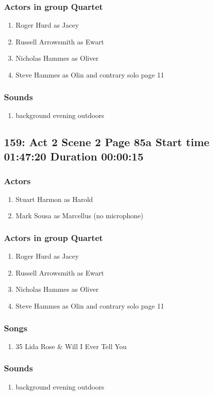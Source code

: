 \subsubsection{Actors in group Quartet}
\begin{enumerate}
\item Roger Hurd as Jacey
\item Russell Arrowsmith as Ewart
\item Nicholas Hammes as Oliver
\item Steve Hammes as Olin and contrary solo page 11
\end{enumerate}

\subsubsection{Sounds}
\begin{enumerate}
\item background evening outdoors
\end{enumerate}
\subsection{159: Act 2 Scene 2 Page 85a Start time 01:47:20 Duration 00:00:15}

\subsubsection{Actors}
\begin{enumerate}
\item Stuart Harmon as Harold
\item Mark Sousa as Marcellus (no microphone)
\end{enumerate}
\subsubsection{Actors in group Quartet}
\begin{enumerate}
\item Roger Hurd as Jacey
\item Russell Arrowsmith as Ewart
\item Nicholas Hammes as Oliver
\item Steve Hammes as Olin and contrary solo page 11
\end{enumerate}

\subsubsection{Songs}
\begin{enumerate}
\item 35 Lida Rose \& Will I Ever Tell You
\end{enumerate}\subsubsection{Sounds}
\begin{enumerate}
\item background evening outdoors
\end{enumerate}
